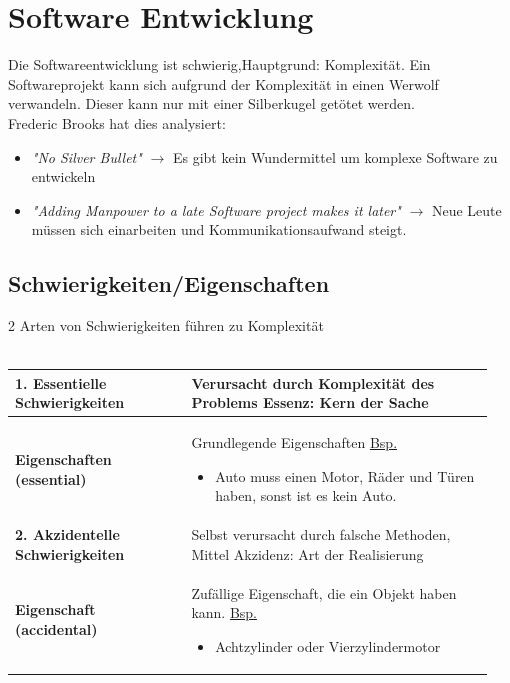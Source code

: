 \section{Software Entwicklung}
\begin{figure}
\end{figure}
Die Softwareentwicklung ist schwierig,Hauptgrund: Komplexität.  
Ein Softwareprojekt kann sich aufgrund der Komplexität in einen Werwolf verwandeln. Dieser kann nur mit einer Silberkugel getötet werden.\\
Frederic Brooks hat dies analysiert: \\
\begin{itemize}
	\item \textit{"No Silver Bullet"} $\rightarrow$ Es gibt kein Wundermittel um komplexe Software zu entwickeln
	\item \textit{"{}Adding Manpower to a late Software project makes it later"}\newline
    $\rightarrow$ Neue Leute müssen sich einarbeiten und Kommunikationsaufwand steigt. 
\end{itemize}

\subsection{Schwierigkeiten/Eigenschaften}
2 Arten von Schwierigkeiten führen zu Komplexität\\ \\
\begin{tabular}{|p{0.35\linewidth}|p{0.6\linewidth}|}
	\hline
	\textbf{1. Essentielle Schwierigkeiten} & Verursacht durch Komplexität des Problems \newline Essenz: Kern der Sache
    \\ \hline
   	\quad\textbf{Eigenschaften (essential)} & Grundlegende Eigenschaften \newline \underline{Bsp.} 
    \begin{itemize}
        \item Auto muss einen Motor, Räder und Türen haben, sonst ist es kein Auto.
    \end{itemize}
    \\ \hline \hline
    
	\textbf{2. Akzidentelle Schwierigkeiten} & Selbst verursacht durch falsche Methoden, Mittel \newline Akzidenz: Art der Realisierung
    \\ \hline

	\quad \textbf{Eigenschaft (accidental)} & Zufällige Eigenschaft, die ein Objekt haben kann. \newline \underline{Bsp.} 
	\begin{itemize}
	\item Achtzylinder oder Vierzylindermotor
	\end{itemize} \\ \hline
\end{tabular}
